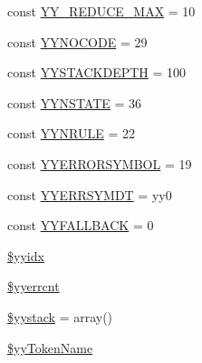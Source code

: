 \begin{DoxyCompactItemize}
\item 
const \hyperlink{class_smarty___internal___configfileparser_a182aa755ef960d48b8c1cba6e921744b}{Y\+Y\+\_\+\+R\+E\+D\+U\+C\+E\+\_\+\+M\+A\+X} = 10
\item 
const \hyperlink{class_smarty___internal___configfileparser_aeb4971986fef5a9cd8e1248f59b07d11}{Y\+Y\+N\+O\+C\+O\+D\+E} = 29
\item 
const \hyperlink{class_smarty___internal___configfileparser_af16eacc338babe0d3b328c54aa40b98f}{Y\+Y\+S\+T\+A\+C\+K\+D\+E\+P\+T\+H} = 100
\item 
const \hyperlink{class_smarty___internal___configfileparser_af263dc417f5c192408a0950db66de634}{Y\+Y\+N\+S\+T\+A\+T\+E} = 36
\item 
const \hyperlink{class_smarty___internal___configfileparser_a2b6a93094d77ff9cc3b5504bd362d6d0}{Y\+Y\+N\+R\+U\+L\+E} = 22
\item 
const \hyperlink{class_smarty___internal___configfileparser_a48deb5ab5d7c066e35e660341b0f07ab}{Y\+Y\+E\+R\+R\+O\+R\+S\+Y\+M\+B\+O\+L} = 19
\item 
const \hyperlink{class_smarty___internal___configfileparser_a5f0bfec11fd87abbb59a6e234d5616b5}{Y\+Y\+E\+R\+R\+S\+Y\+M\+D\+T} = \textquotesingle{}yy0\textquotesingle{}
\item 
const \hyperlink{class_smarty___internal___configfileparser_ad31369d98eca12017f53b9fdd2737127}{Y\+Y\+F\+A\+L\+L\+B\+A\+C\+K} = 0
\item 
\hyperlink{class_smarty___internal___configfileparser_aa9941e3de2153c9b66e05e3b11a88c8c}{\$yyidx}
\item 
\hyperlink{class_smarty___internal___configfileparser_a439c58ecabc9563ba54aca3735b2fb9d}{\$yyerrcnt}
\item 
\hyperlink{class_smarty___internal___configfileparser_a75b70f4a796529f426c8d4d56fb13482}{\$yystack} = array()
\item 
\hyperlink{class_smarty___internal___configfileparser_a69b166b21ef45f858ac2e670a299b746}{\$yy\+Token\+Name}
\end{DoxyCompactItemize}
